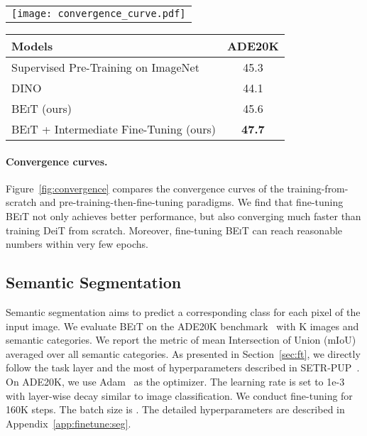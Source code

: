 \documentclass{article}
\newcommand\our{\textsc{BEiT}}
\begin{document}
\begin{table*}[t]
\centering
\small
\begin{minipage}{2.4in}
\centering
\begin{tabular}{c}
\texttt{[image: convergence\_curve.pdf]}
\end{tabular}
\caption{Convergence curves of training DeiT from scratch and fine-tuning \our{} on ImageNet-1K.}
\label{fig:convergence}
\end{minipage}
\hfill
\begin{minipage}{2.8in}
\centering
\begin{tabular}{@{}lc@{}}
\toprule
\bf Models & \bf ADE20K \\
\midrule
Supervised Pre-Training on ImageNet & 45.3 \\
\midrule
DINO~\citep{dino} & 44.1 \\
\our{} (ours) & 45.6 \\
\our{} + Intermediate Fine-Tuning (ours) & \bf 47.7 \\
\bottomrule
\end{tabular}
\caption{Results of semantic segmentation on ADE20K.
We use SETR-PUP~\citep{setr} as the task layer and report results of single-scale inference.
}
\label{tbl:results:seg}
\end{minipage}
\end{table*}




\paragraph{Convergence curves.}
Figure~\ref{fig:convergence} compares the convergence curves of the training-from-scratch and pre-training-then-fine-tuning paradigms.
We find that fine-tuning \our{} not only achieves better performance, but also converging much faster than training DeiT from scratch.
Moreover, fine-tuning \our{} can reach reasonable numbers within very few epochs.


\subsection{Semantic Segmentation}
\label{sec:results:seg}

Semantic segmentation aims to predict a corresponding class for each pixel of the input image.
We evaluate \our{} on the ADE20K benchmark~\citep{ade20k} with K images and  semantic categories.
We report the metric of mean Intersection of Union (mIoU) averaged over all semantic categories.
As presented in Section~\ref{sec:ft}, we directly follow the task layer and the most of hyperparameters described in SETR-PUP~\citep{setr}.
On ADE20K, we use Adam~\citep{adamw} as the optimizer. The learning rate is set to 1e-3 with layer-wise decay similar to image classification.
We conduct fine-tuning for 160K steps. The batch size is .
The detailed hyperparameters are described in Appendix~\ref{app:finetune:seg}.
\end{document}
